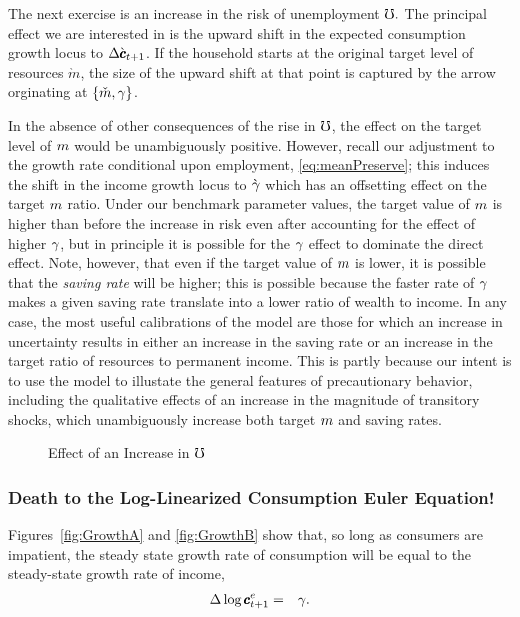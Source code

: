 \documentclass{handout}
\begin{document}
The next exercise is an increase in the risk of unemployment $\mho.$
The principal effect we are interested in is the upward shift in the expected
consumption growth locus to $\Delta \grave{\pmb{c}}_{t+1}$.  If the
household starts at the original target level of resources
$\grave{m}$, the size of the upward shift at that point is captured by the
arrow orginating at $\{\check{m},\gamma\}$.  

In the absence of other consequences of the rise in $\mho$, the
effect on the target level of $m$ would be unambiguously positive.
However, recall our adjustment to the growth rate conditional upon
employment, \eqref{eq:meanPreserve}; this induces the shift in the
income growth locus to $\grave{\gamma}$ which has an offsetting effect
on the target $m$ ratio.  Under our benchmark parameter values,
the target value of $m$ is higher than before the increase in risk
even after accounting for the effect of higher $\gamma$, but in
principle it is possible for the $\gamma$ effect to dominate the direct
effect.  Note, however, that even if the target value of $m$ is
lower, it is possible that the {\it saving rate} will be higher; this
is possible because the faster rate of $\gamma$ makes a given saving
rate translate into a lower ratio of wealth to income.  In any case,
the most useful calibrations of the model are those for
which an increase in uncertainty results in either an increase in the
saving rate or an increase in the target ratio of resources to
permanent income.  This is partly because our intent is to use the
model to illustate the general features of precautionary behavior,
including the qualitative effects of an increase in the magnitude of
transitory shocks, which unambiguously increase both target $m$
and saving rates.

\begin{figure}
\caption{Effect of an Increase in $\mho$}
\label{fig:cGroIncreaseMhoPlot}
\end{figure}

\subsubsection{Death to the Log-Linearized Consumption Euler Equation!}

Figures~\ref{fig:GrowthA} and \ref{fig:GrowthB} show that, so long as
consumers are impatient, the steady state growth rate of consumption
will be equal to the steady-state growth rate of income,
\begin{eqnarray}
        \Delta \log \pmb{c}^{e}_{t+1} & = & \gamma. \label{eq:ceqg}
\end{eqnarray}
\end{document}
